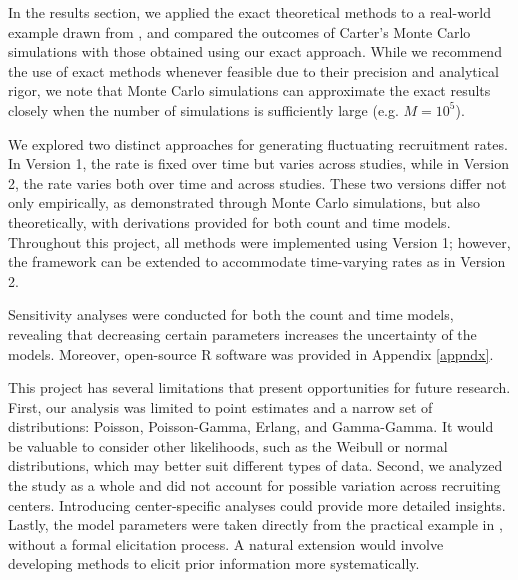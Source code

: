 In the results section, we applied the exact theoretical methods to a real-world example drawn from \cite{carter2004application}, and compared the outcomes of Carter's Monte Carlo simulations with those obtained using our exact approach. While we recommend the use of exact methods whenever feasible due to their precision and analytical rigor, we note that Monte Carlo simulations can approximate the exact results closely when the number of simulations is sufficiently large (e.g. $M=10^5$).

We explored two distinct approaches for generating fluctuating recruitment rates. In Version 1, the rate is fixed over time but varies across studies, while in Version 2, the rate varies both over time and across studies. These two versions differ not only empirically, as demonstrated through Monte Carlo simulations, but also theoretically, with derivations provided for both count and time models. Throughout this project, all methods were implemented using Version 1; however, the framework can be extended to accommodate time-varying rates as in Version 2. 

Sensitivity analyses were conducted for both the count and time models, revealing that decreasing certain parameters increases the uncertainty of the models. Moreover, open-source R software was provided in Appendix \ref{appndx}.

This project has several limitations that present opportunities for future research. First, our analysis was limited to point estimates and a narrow set of distributions: Poisson, Poisson-Gamma, Erlang, and Gamma-Gamma. It would be valuable to consider other likelihoods, such as the Weibull or normal distributions, which may better suit different types of data. Second, we analyzed the study as a whole and did not account for possible variation across recruiting centers. Introducing center-specific analyses could provide more detailed insights. Lastly, the model parameters were taken directly from the practical example in \cite{carter2004application}, without a formal elicitation process. A natural extension would involve developing methods to elicit prior information more systematically.

